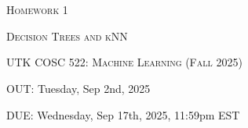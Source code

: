 \documentclass{article}
\begin{document}
\section*{}
\begin{center}
  \centerline{\textsc{\LARGE  Homework 1}}
  \vspace{0.5em}
  \centerline{\textsc{\LARGE Decision Trees and kNN}
  }
  \vspace{1em}
  \textsc{\large UTK COSC 522: Machine Learning (Fall 2025)} \\
  \vspace{0.5em}
  \centerline{OUT: Tuesday, Sep 2nd, 2025}
  \vspace{0.5em}
  \centerline{DUE: Wednesday, Sep 17th, 2025, 11:59pm EST}
\end{center}
\end{document}

